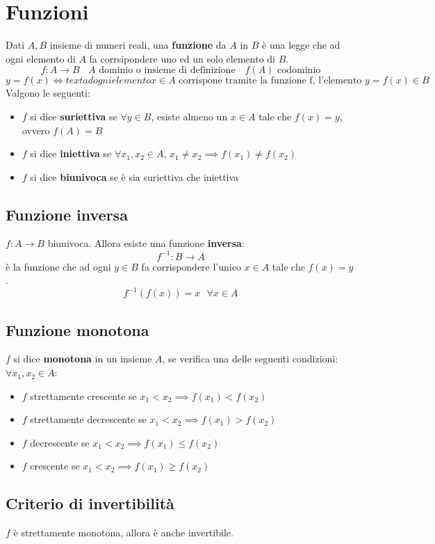\documentclass[../../main.tex]{subfiles}
\begin{document}
\section{Funzioni}
Dati $A, B$ insieme di numeri reali, una \textbf{funzione} da $A$ in $B$ è una
legge che ad ogni elemento di $A$ fa corrsipondere uno ed un solo elemento di
$B$.
\[
    f: A \rightarrow B \ \ \ \ A \text{ dominio o insieme di definizione } \ \ \ f(A) \text{ codominio}
\]
\[
    y = f(x) \iff text{ ad ogni elemento } x \in A \text{ corrispone tramite la funzione f, l'elemento } y = f(x) \in B
\]
Valgono le seguenti:
\begin{itemize}
    \item $f$ si dice \textbf{suriettiva} se $\forall y\in B$, esiste almeno un $x\in A$ tale che $f(x) = y$, ovvero $f(A) = B$
    \item $f$ si dice \textbf{iniettiva} se $\forall x_1, x_2 \in A$, $x_1 \neq x_2 \implies f(x_1) \neq f(x_2)$
    \item $f$ si dice \textbf{biunivoca} se è sia suriettiva che iniettiva
\end{itemize}

\subsection{Funzione inversa}
$f: A \rightarrow B$ biunivoca. Allora esiste una funzione \textbf{inversa}:
\[
    f^{-1}: B \rightarrow A
\]
è la funzione che ad ogni $y\in B$ fa corrispondere l'unico $x\in A$ tale che $f(x) = y$.
\[
    f^{-1}(f(x)) =x \ \ \ \forall x \in A
\]
\subsection{Funzione monotona}
$f$ si dice \textbf{monotona} in un insieme $A$, se verifica una delle seguenti condizioni:\\
$\forall x_1,x_2 \in A$:
\begin{itemize}
    \item $f$ strettamente crescente se $x_1 < x_2 \implies f(x_1) < f(x_2)$
    \item $f$ strettamente decrescente se $x_1 < x_2 \implies f(x_1) > f(x_2)$
    \item $f$ decrescente se $x_1 < x_2 \implies f(x_1) \leq f(x_2)$
    \item $f$ crescente se $x_1 < x_2 \implies f(x_1) \geq f(x_2)$
\end{itemize}

\subsection{Criterio di invertibilità}
$f$ è strettamente monotona, allora è anche invertibile.
\end{document}
